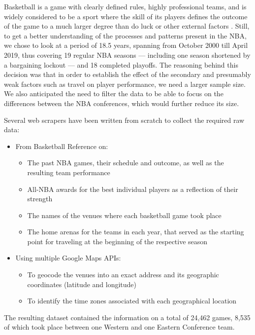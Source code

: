 \documentclass[
    12pt,
    a4paper,
    titlepage,  %
    abstract,  %
    headings=standardclasses,  %
    bibliography=totocnumbered  %
]{scrartcl}
\begin{document}
Basketball is a game with clearly defined rules, highly professional teams, and is widely considered to be a sport where the skill of its players defines the outcome of the game to a much larger degree than do luck or other external factors \cite{mauboussin}. Still, to get a better understanding of the processes and patterns present in the NBA, we chose to look at a period of 18.5 years, spanning from October 2000 till April 2019, thus covering 19 regular NBA seasons — including one season shortened by a bargaining lockout — and 18 completed playoffs. The reasoning behind this decision was that in order to establish the effect of the secondary and presumably weak factors such as travel on player performance, we need a larger sample size. We also anticipated the need to filter the data to be able to focus on the differences between the NBA conferences, which would further reduce its size.

Several web scrapers have been written from scratch to collect the required raw data:

\begin{itemize}
    \item From Basketball Reference on:
    \begin{itemize}
        \item The past NBA games, their schedule and outcome, as well as the resulting team performance
        \item All-NBA awards for the best individual players as a reflection of their strength
        \item The names of the venues where each basketball game took place
        \item The home arenas for the teams in each year, that served as the starting point for traveling at the beginning of the respective season
    \end{itemize}
    \item Using multiple Google Maps APIs:
    \begin{itemize}
        \item To geocode the venues into an exact address and its geographic coordinates (latitude and longitude)
        \item To identify the time zones associated with each geographical location
    \end{itemize}
\end{itemize}

The resulting dataset contained the information on a total of 24,462 games, 8,535 of which took place between one Western and one Eastern Conference team.
\end{document}
